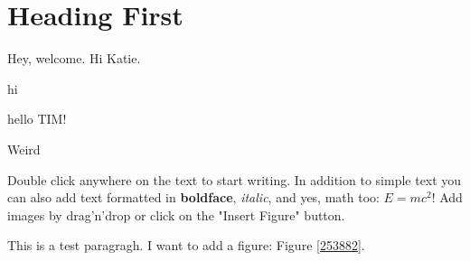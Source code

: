 \section{Heading First}
Hey, welcome. Hi Katie. 


hi

hello TIM! 

Weird

Double click anywhere on the text to start writing. In addition to simple text you can also add text formatted in \textbf{boldface}, \textit{italic}, and yes, math too: $E  =  mc^{2}$! Add images by drag'n'drop or click on the "Insert Figure" button. 

This is a test paragragh. I want to add a figure: Figure \ref{253882}.
